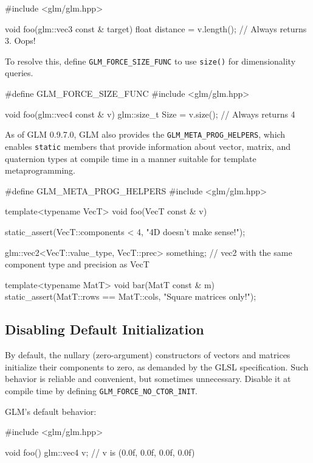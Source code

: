 \documentclass{scrartcl}
\numberwithin{figure}{subsection}
\begin{document}
\begin{cppcode}
#include <glm/glm.hpp>

void foo(glm::vec3 const & target)
{
  float distance = v.length();  // Always returns 3.  Oops!
}
\end{cppcode}

To resolve this, define \verb|GLM_FORCE_SIZE_FUNC| to use \verb|size()| for dimensionality queries.

\begin{cppcode}
#define GLM_FORCE_SIZE_FUNC 
#include <glm/glm.hpp>

void foo(glm::vec4 const & v)
{
  glm::size_t Size = v.size();  // Always returns 4
}
\end{cppcode}

As of GLM 0.9.7.0, GLM also provides the \verb|GLM_META_PROG_HELPERS|, which enables \verb|static| members that provide information about vector, matrix, and quaternion types at compile time in a manner suitable for template metaprogramming.

\begin{cppcode}
#define GLM_META_PROG_HELPERS
#include <glm/glm.hpp>

template<typename VecT>
void foo(VecT const & v)
{
  static_assert(VecT::components < 4, "4D doesn't make sense!");

  glm::vec2<VecT::value_type, VecT::prec> something;
  // vec2 with the same component type and precision as VecT
}

template<typename MatT>
void bar(MatT const & m)
{
  static_assert(MatT::rows == MatT::cols, "Square matrices only!");
}
\end{cppcode}


\subsection{Disabling Default Initialization}

By default, the nullary (zero-argument) constructors of vectors and matrices initialize their components to zero, as demanded by the GLSL specification.  Such behavior is reliable and convenient, but sometimes unnecessary.  Disable it at compile time by defining \verb|GLM_FORCE_NO_CTOR_INIT|.

GLM's default behavior:

\begin{cppcode}
#include <glm/glm.hpp>

void foo()
{
  glm::vec4 v; // v is (0.0f, 0.0f, 0.0f, 0.0f)
}
\end{cppcode}
\end{document}

